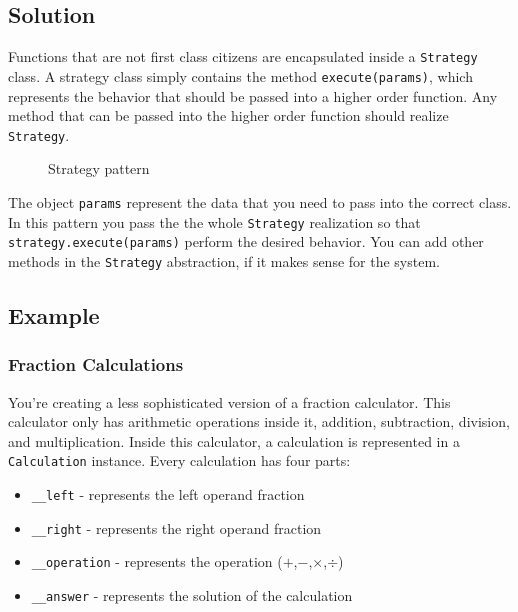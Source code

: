 \subsection{Solution}\label{behavioral-patterns.md__solution}

Functions that are not first class citizens are encapsulated inside a
\texttt{Strategy} class. A strategy class simply contains the method
\texttt{execute(params)}, which represents the behavior that should be
passed into a higher order function. Any method that can be passed into
the higher order function should realize \texttt{Strategy}.

\begin{figure}
\centering
{}
\caption{Strategy pattern}
\end{figure}

The object \texttt{params} represent the data that you need to pass into
the correct class. In this pattern you pass the the whole
\texttt{Strategy} realization so that \texttt{strategy.execute(params)}
perform the desired behavior. You can add other methods in the
\texttt{Strategy} abstraction, if it makes sense for the system.

\subsection{Example}\label{behavioral-patterns.md__example}

\subsubsection{Fraction
Calculations}\label{behavioral-patterns.md__fraction-calculations}

You're creating a less sophisticated version of a fraction calculator.
This calculator only has arithmetic operations inside it, addition,
subtraction, division, and multiplication. Inside this calculator, a
calculation is represented in a \texttt{Calculation} instance. Every
calculation has four parts:

\begin{itemize}
\tightlist
\item
  \texttt{\_\_left} - represents the left operand fraction
\item
  \texttt{\_\_right} - represents the right operand fraction
\item
  \texttt{\_\_operation} - represents the operation
  (\(+\),\(-\),\(\times\),\(\div\))
\item
  \texttt{\_\_answer} - represents the solution of the calculation
\end{itemize}

